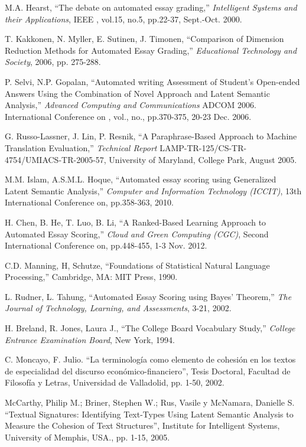 \documentclass[12pt]{diicc}
\begin{document}
\begin{thebibliography} {}
	M.A. Hearst, ``The debate on automated essay grading,'' {\em Intelligent Systems and their Applications}, IEEE , vol.15, no.5, pp.22-37, Sept.-Oct. 2000.
	
	T. Kakkonen, N. Myller, E. Sutinen, J. Timonen, ``Comparison of Dimension Reduction Methods for Automated Essay Grading,'' {\em Educational Technology and Society}, 2006, pp. 275-288.
	
	 P. Selvi, N.P. Gopalan, ``Automated writing Assessment of Student's Open-ended Answers Using the Combination of Novel Approach and Latent Semantic Analysis,'' {\em Advanced Computing and Communications} ADCOM 2006. International Conference on , vol., no., pp.370-375, 20-23 Dec. 2006.
	
	G. Russo-Lassner, J. Lin, P. Resnik, ``A Paraphrase-Based Approach to Machine Translation Evaluation,'' {\em Technical Report} LAMP-TR-125/CS-TR-4754/UMIACS-TR-2005-57, University of Maryland, College Park, August 2005.
	
	M.M. Islam, A.S.M.L. Hoque, ``Automated essay scoring using Generalized Latent Semantic Analysis,'' {\em Computer and Information Technology (ICCIT)}, 13th International Conference on, pp.358-363, 2010.
	
	H. Chen, B. He, T. Luo, B. Li, ``A Ranked-Based Learning Approach to Automated Essay Scoring,'' {\em Cloud and Green Computing (CGC)}, Second International Conference on, pp.448-455, 1-3 Nov. 2012.
	
	C.D. Manning, H, Schutze, ``Foundations of Statistical Natural Language Processing,'' Cambridge, MA: MIT Press, 1990.
	
	L. Rudner, L. Tahung, ``Automated Essay Scoring using Bayes' Theorem,'' {\em The Journal of Technology, Learning, and Assessments}, 3-21, 2002.
	
	H. Breland, R. Jones, Laura J., ``The College Board Vocabulary Study,'' {\em College Entrance Examination Board}, New York, 1994.
	
	C. Moncayo, F. Julio. ``La terminología como elemento de cohesión en los textos de especialidad del discurso económico-financiero'', Tesis Doctoral, Facultad de Filosofía y Letras, Universidad de Valladolid, pp. 1-50, 2002.
	
	
	McCarthy, Philip M.; Briner, Stephen W.; Rus, Vasile y McNamara, Danielle S. ``Textual Signatures: Identifying Text-Types Using Latent Semantic Analysis to Measure the Cohesion of Text Structures'', Institute for Intelligent Systems, University of Memphis, USA., pp. 1-15, 2005.
	

\end{thebibliography}
\end{document}
